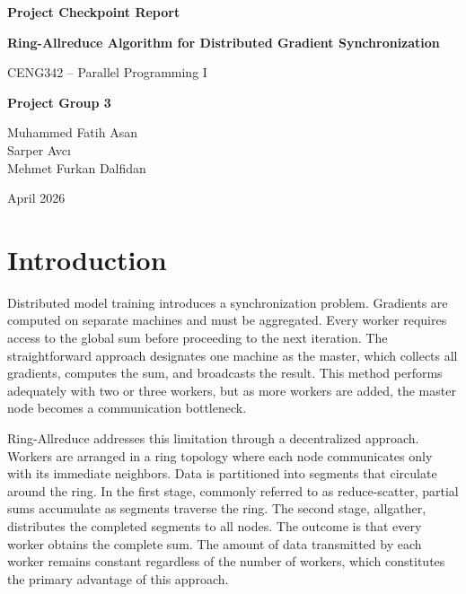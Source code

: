 \documentclass[12pt,a4paper]{article}
\begin{document}
\begin{titlepage}
    \centering
    \vspace*{2cm}

    {\Large\bfseries Project Checkpoint Report\par}
    \vspace{0.5cm}
    {\LARGE\bfseries Ring-Allreduce Algorithm for Distributed Gradient Synchronization\par}
    \vspace{1.5cm}

    {\large CENG342 -- Parallel Programming I\par}
    \vspace{2cm}

    {\large\bfseries Project Group 3\par}
    \vspace{1cm}

    Muhammed Fatih Asan\\[0.3cm]
    Sarper Avc{\i}\\[0.3cm]
    Mehmet Furkan Dalfidan

    \vfill

    {\large April 2026\par}
\end{titlepage}

\tableofcontents
\newpage

\section{Introduction}

Distributed model training introduces a synchronization problem. Gradients are computed on separate machines and must be aggregated. Every worker requires access to the global sum before proceeding to the next iteration. The straightforward approach designates one machine as the master, which collects all gradients, computes the sum, and broadcasts the result. This method performs adequately with two or three workers, but as more workers are added, the master node becomes a communication bottleneck.

Ring-Allreduce addresses this limitation through a decentralized approach. Workers are arranged in a ring topology where each node communicates only with its immediate neighbors. Data is partitioned into segments that circulate around the ring. In the first stage, commonly referred to as reduce-scatter, partial sums accumulate as segments traverse the ring. The second stage, allgather, distributes the completed segments to all nodes. The outcome is that every worker obtains the complete sum. The amount of data transmitted by each worker remains constant regardless of the number of workers, which constitutes the primary advantage of this approach.
\end{document}
